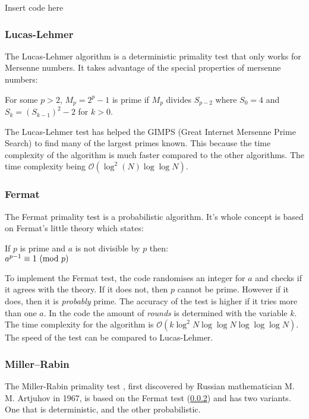\documentclass[main.tex]{subfiles}
\begin{document}
\begin{python}
  Insert code here
\end{python}

\subsubsection{Lucas-Lehmer}
The Lucas-Lehmer algorithm \cite{algh:lucas} is a deterministic primality test
that only works for Mersenne numbers. It takes advantage of the special
properties of mersenne numbers: \newline

\begin{mdframed}
  For some $p>2$, $M_p=2^p-1$ is prime if $M_p$ divides $S_{p-2}$ where $S_0=4$ and
  $S_k=(S_{k-1})^2-2$ for $k>0$.
\end{mdframed}

The Lucas-Lehmer test has helped the GIMPS (Great Internet Mersenne Prime
Search) \cite{GIMPS} to find many of the largest primes known. This because the
time complexity of the algorithm is much faster compared to the other
algorithms. The time complexity being $\mathcal{O}(\log^{2}(N) \log \log N)$.

\subsubsection{Fermat} \label{fermat} The Fermat primality test
\cite{algh:fermat} is a probabilistic algorithm. It's whole concept is based on
Fermat's little theory \cite{fermat:little} which states:

\begin{mdframed}
  \begin{center}
    If $p$ is prime and $a$ is not divisible by $p$ then: \\
    $a^{p - 1} \equiv 1 \ (\mathrm{mod}\ p)$
  \end{center}
\end{mdframed}

To implement the Fermat test, the code randomises an integer for $a$ and checks
if it agrees with the theory. If it does not, then $p$ cannot be prime. However
if it does, then it is \emph{probably} prime. The accuracy of the test is higher
if it tries more than one $a$. In the code the amount of \emph{rounds} is
determined with the variable $k$. The time complexity for the algorithm is
$\mathcal{O}(k \log^{2}N \log \log N \log \log \log N)$. The speed of the test
can be compared to Lucas-Lehmer.

\subsubsection{Miller–Rabin} The Miller-Rabin primality test \cite{algh:miller},
first discovered by Russian mathematician M. M. Artjuhov in 1967, is based on
the Fermat test (\ref{fermat}) and has two variants. One that is deterministic, and the other probabilistic. \\
\end{document}
